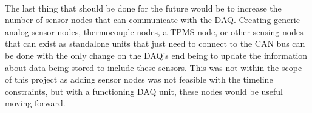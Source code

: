 \paragraph{}
The last thing that should be done for the future would be to increase the number of sensor nodes that can communicate with the DAQ.
Creating generic analog sensor nodes, thermocouple nodes, a TPMS node, or other sensing nodes that can exist as standalone units that just need to connect to the CAN bus can be done with the only change on the DAQ's end being to update the information about data being stored to include these sensors.
This was not within the scope of this project as adding sensor nodes was not feasible with the timeline constraints, but with a functioning DAQ unit, these nodes would be useful moving forward.